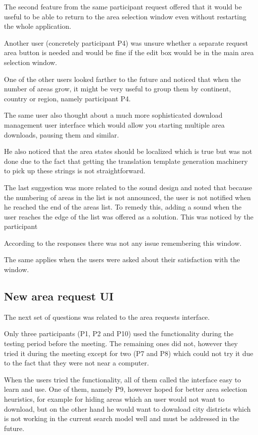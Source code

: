 \documentclass[nolof,digital]{fithesis3}
\begin{document}
The second feature from the same participant request offered that it would be useful to be able to return to the area selection window even without restarting the whole application.

Another user (concretely participant P4) was unsure whether a separate request area button is needed and would be fine if the edit box would be in the main area selection window.

One of the other users looked farther to the future and noticed that when the number of areas grow, it might be very useful to group them by continent, country or region, namely participant P4.

The same user also thought about a much more sophisticated download management user interface which would allow you starting multiple area downloads, pausing them and similar.

He also noticed that the area states should be localized which is true but was not done due to the fact that getting the translation template generation machinery to pick up these strings is not straightforward.

The last suggestion was more related to the sound design and noted that because the numbering of areas in the list is not announced, the user is not notified when he reached the end of the areas list. To remedy this, adding a sound when the user reaches the edge of the list was offered as a solution. This was noticed by the participant 

According to the responses there was not any issue remembering this window.

The same applies when the users were asked about their satisfaction with the window.
\subsection{New area request UI}
The next set of questions was related to the area requests interface.

Only three participants (P1, P2 and P10) used the functionality during the testing period before the meeting. The remaining ones did not, however they tried it during the meeting except for two (P7 and P8) which could not try it due to the fact that they were not near a computer.

When the users tried the functionality, all of them called the interface easy to learn and use. One of them, namely P9, however hoped for better area selection heuristics, for example for hiding areas which an user would not want to download, but on the other hand he would want to download city districts which is not working in the current search model well and must be addressed in the future.
\end{document}
